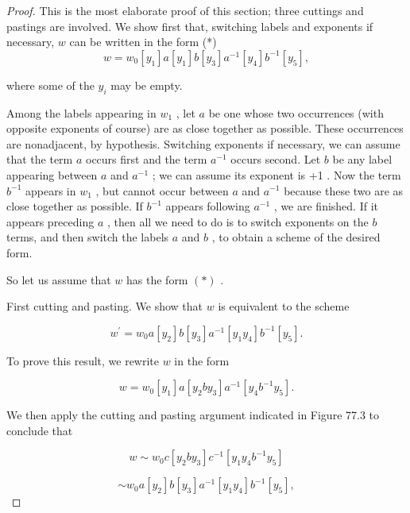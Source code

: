 \begin{proof}This is the most elaborate proof of this section; three cuttings and pastings are involved. We show first that, switching labels and exponents if necessary, \(w\) can be written in the form
(*)
\[
w = {w}_{0}\left\lbrack  {y}_{1}\right\rbrack  a\left\lbrack  {y}_{1}\right\rbrack  b\left\lbrack  {y}_{3}\right\rbrack  {a}^{-1}\left\lbrack  {y}_{4}\right\rbrack  {b}^{-1}\left\lbrack  {y}_{5}\right\rbrack  ,
\]

where some of the \({y}_{i}\) may be empty.

Among the labels appearing in \({w}_{1}\) , let \(a\) be one whose two occurrences (with opposite exponents of course) are as close together as possible. These occurrences are nonadjacent, by hypothesis. Switching exponents if necessary, we can assume that the term \(a\) occurs first and the term \({a}^{-1}\) occurs second. Let \(b\) be any label appearing between \(a\) and \({a}^{-1}\) ; we can assume its exponent is +1 . Now the term \({b}^{-1}\) appears in \({w}_{1}\) , but cannot occur between \(a\) and \({a}^{-1}\) because these two are as close together as possible. If \({b}^{-1}\) appears following \({a}^{-1}\) , we are finished. If it appears preceding \(a\) , then all we need to do is to switch exponents on the \(b\) terms, and then switch the labels \(a\) and \(b\) , to obtain a scheme of the desired form.

So let us assume that \(w\) has the form \(\left( *\right)\) .

First cutting and pasting. We show that \(w\) is equivalent to the scheme

\[
{w}^{\prime } = {w}_{0}a\left\lbrack  {y}_{2}\right\rbrack  b\left\lbrack  {y}_{3}\right\rbrack  {a}^{-1}\left\lbrack  {{y}_{1}{y}_{4}}\right\rbrack  {b}^{-1}\left\lbrack  {y}_{5}\right\rbrack  .
\]

To prove this result, we rewrite \(w\) in the form

\[
w = {w}_{0}\left\lbrack  {y}_{1}\right\rbrack  a\left\lbrack  {{y}_{2}b{y}_{3}}\right\rbrack  {a}^{-1}\left\lbrack  {{y}_{4}{b}^{-1}{y}_{5}}\right\rbrack  .
\]

We then apply the cutting and pasting argument indicated in Figure 77.3 to conclude that

\[
w \sim  {w}_{0}c\left\lbrack  {{y}_{2}b{y}_{3}}\right\rbrack  {c}^{-1}\left\lbrack  {{y}_{1}{y}_{4}{b}^{-1}{y}_{5}}\right\rbrack
\]

\[
\sim  {w}_{0}a\left\lbrack  {y}_{2}\right\rbrack  b\left\lbrack  {y}_{3}\right\rbrack  {a}^{-1}\left\lbrack  {{y}_{1}{y}_{4}}\right\rbrack  {b}^{-1}\left\lbrack  {y}_{5}\right\rbrack  ,
\]


\end{proof}

